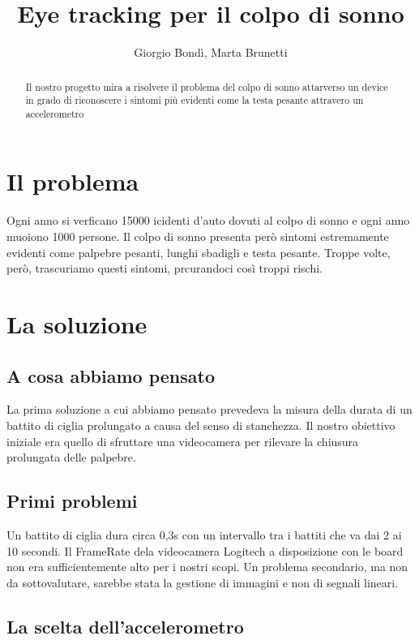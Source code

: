 \documentclass[a4paper]{article}
\begin{document}
\title{Eye tracking per il colpo di sonno}
\author{Giorgio Bondì, Marta Brunetti}
\maketitle
\begin{abstract} Il nostro progetto mira a risolvere il problema del colpo di sonno attarverso un device in grado di riconoscere i sintomi più evidenti come la testa pesante attravero un accelerometro
\end{abstract}
\section*{Il problema}
Ogni anno si verficano 15000 icidenti d'auto dovuti al colpo di sonno e ogni anno muoiono 1000 persone. 
Il colpo di sonno presenta però sintomi estremamente evidenti come palpebre pesanti, lunghi sbadigli e testa pesante.
Troppe volte, però, trascuriamo questi  sintomi, prcurandoci così troppi rischi.
\section*{La soluzione}
\subsection*{A cosa abbiamo pensato}
La prima soluzione a cui abbiamo pensato prevedeva la misura della durata di un battito di ciglia prolungato a causa del senso di stanchezza. Il nostro obiettivo iniziale era quello di sfruttare una videocamera per rilevare la chiusura prolungata delle palpebre. 
\subsection*{Primi problemi}
Un battito di ciglia dura circa 0,3s con un intervallo tra i battiti che va dai 2 ai 10 secondi. Il FrameRate dela videocamera Logitech a disposizione con le board non era sufficientemente alto per i nostri scopi. Un problema secondario, ma non da sottovalutare, sarebbe stata la gestione di immagini e non di segnali lineari.
\subsection*{La scelta dell'accelerometro}
\end{document}

